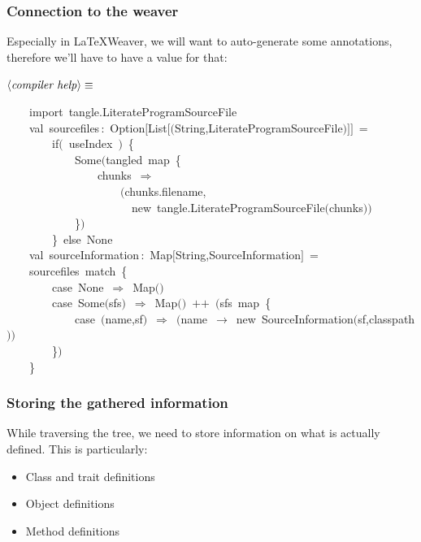 \documentclass[a4paper,12pt]{article}
\begin{document}
\subsubsection{Connection to the weaver}
Especially in LaTeXWeaver, we will want to auto-generate some annotations,
therefore we'll have to have a value for that:

$\left<\mbox{\emph{compiler help}}\right>\equiv$
\begin{program}~~~~{\vem import}~tangle.LiterateProgramSourceFile
\\~~~~{\vem val}~sourcefiles\,{\rm :}~Option$[$List$[$$($String,LiterateProgramSourceFile$)$$]$$]$~=
\\~~~~~~~~{\vem if}$($~useIndex~$)$~{\small\{}
\\~~~~~~~~~~~~Some$($tangled~map~{\small\{}
\\~~~~~~~~~~~~~~~~chunks~$\Rightarrow$
\\~~~~~~~~~~~~~~~~~~~~$($chunks.filename,
\\~~~~~~~~~~~~~~~~~~~~~~{\vem new}~tangle.LiterateProgramSourceFile$($chunks$)$$)$
\\~~~~~~~~~~~~{\small\}}$)$
\\~~~~~~~~{\small\}}~{\vem else}~None
\\[0.5em]~~~~{\vem val}~sourceInformation\,{\rm :}~Map$[$String,SourceInformation$]$~=
\\~~~~sourcefiles~{\vem match}~{\small\{}
\\~~~~~~~~{\vem case}~None~$\Rightarrow$~Map$($$)$
\\~~~~~~~~{\vem case}~Some$($sfs$)$~$\Rightarrow$~Map$($$)$~$+$$+$~$($sfs~map~{\small\{}
\\~~~~~~~~~~~~{\vem case}~$($name,sf$)$~$\Rightarrow$~$($name~$\rightarrow$~{\vem new}~SourceInformation$($sf,classpath$)$$)$
\\~~~~~~~~{\small\}}$)$
\\~~~~{\small\}}
\\[0.5em]\end{program}


\subsubsection{Storing the gathered information}
While traversing the tree, we need to store information on what is actually
defined. This is particularly:

\begin{itemize}
\item Class and trait definitions
\item Object definitions
\item Method definitions
\end{itemize}
\end{document}
